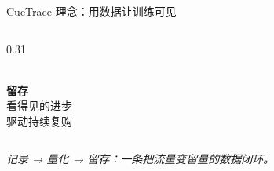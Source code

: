 \documentclass[aspectratio=169,11pt]{ctexbeamer}
\begin{document}
\begin{frame}{CueTrace 理念：用数据让训练可见}
\begin{columns}[T]
\begin{column}{0.31\textwidth}
\begin{center}
        {\color{dachuan}\Huge\faSync}\\[8pt]

        \textbf{留存}\\[4pt]

        {\color{txtsub}\small 看得见的进步\\驱动持续复购}

      \end{center}

    \end{column}

  \end{columns}

  \vspace{1.0em}

  \begin{center}

    \color{dachuanlt}\itshape 记录 → 量化 → 留存：一条把流量变留量的数据闭环。

  \end{center}

\end{frame}



\end{document}
